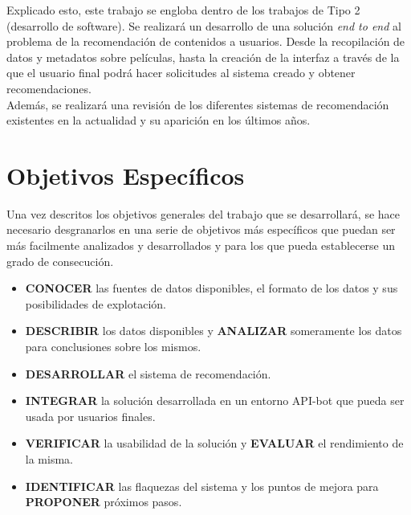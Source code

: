 Explicado esto, este trabajo se engloba dentro de los trabajos de Tipo 2 (desarrollo de software). Se realizará un desarrollo de una solución \textit{end to end} al problema de la recomendación de contenidos a usuarios. Desde la recopilación de datos y metadatos sobre películas, hasta la creación de la interfaz a través de la que el usuario final podrá hacer solicitudes al sistema creado y obtener recomendaciones.\\

Además, se realizará una revisión de los diferentes sistemas de recomendación existentes en la actualidad y su aparición en los últimos años.\\



\section{Objetivos Específicos}\label{sec:objespecificos}

Una vez descritos los objetivos generales del trabajo que se desarrollará, se hace necesario desgranarlos en una serie de objetivos más específicos que puedan ser más facilmente analizados y desarrollados y para los que pueda establecerse un grado de consecución.

\begin{itemize}
    \item \textbf{CONOCER} las fuentes de datos disponibles, el formato de los datos y sus posibilidades de explotación.
    \item \textbf{DESCRIBIR} los datos disponibles y \textbf{ANALIZAR} someramente los datos para conclusiones sobre los mismos.
    \item \textbf{DESARROLLAR} el sistema de recomendación.
    \item \textbf{INTEGRAR} la solución desarrollada en un entorno API-bot que pueda ser usada por usuarios finales.
    \item \textbf{VERIFICAR} la usabilidad de la solución y \textbf{EVALUAR} el rendimiento de la misma.
    \item \textbf{IDENTIFICAR} las flaquezas del sistema y los puntos de mejora para \textbf{PROPONER} próximos pasos.
\end{itemize}


